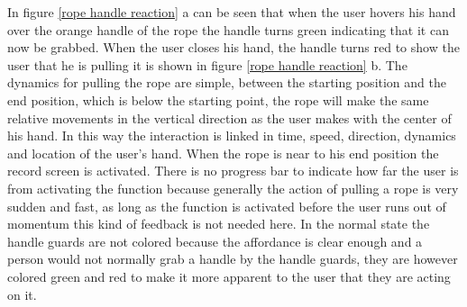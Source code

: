 In figure \ref{rope handle reaction} a can be seen that when the user hovers his hand over the orange handle of the rope the handle turns green indicating that it can now be grabbed. When the user closes his hand, the handle turns red to show the user that he is pulling it is shown in figure \ref{rope handle reaction} b. The dynamics for pulling the rope are simple, between the starting position and the end position, which is below the starting point, the rope will make the same relative movements in the vertical direction as the user makes with the center of his hand. In this way the interaction is linked in time, speed, direction, dynamics and location of the user's hand. When the rope is near to his end position the record screen is activated. There is no progress bar to indicate how far the user is from activating the function because generally the action of pulling a rope is very sudden and fast, as long as the function is activated before the user runs out of momentum this kind of feedback is not needed here. In the normal state the handle guards are not colored because the affordance is clear enough and a person would not normally grab a handle by the handle guards, they are however colored green and red to make it more apparent to the user that they are acting on it.\\

